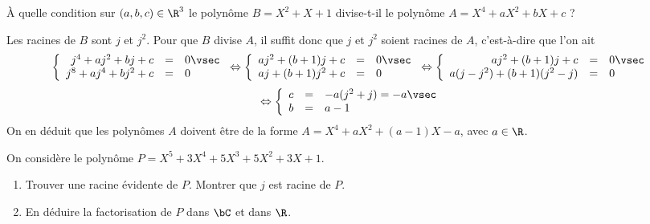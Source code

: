 \documentclass[a4paper, 11pt,reqno]{article}
\begin{document}
\begin{exercice}  \;
	\`{A} quelle condition sur $(a,b,c)\in\R^3$ le polyn\^{o}me $B=X^2+X+1$ divise-t-il le polyn\^ome $A=X^4+aX^2+bX+c$ ?
\end{exercice}
\begin{correction}  \;
	Les racines de $B$ sont $j$ et $j^2$. Pour que $B$ divise $A$, il suffit donc que $j$ et $j^2$ soient racines de $A$, c'est-\`a-dire que l'on ait
	$$\left\{ \begin{array}{rcl}
			j^4+aj^2+bj+c   & = & 0\vsec \\
			j^8+aj^4+bj^2+c & = & 0
		\end{array}\right.
		\Leftrightarrow
		\left\{ \begin{array}{rcl}
			aj^2+(b+1)j+c & = & 0\vsec \\
			aj+(b+1)j^2+c & = & 0
		\end{array}\right.
		\Leftrightarrow
		\left\{ \begin{array}{rcl}
			aj^2+(b+1)j+c         & = & 0\vsec \\
			a(j-j^2)+(b+1)(j^2-j) & = & 0
		\end{array}\right.
	$$
	$$
		\Leftrightarrow
		\left\{ \begin{array}{rcl}
			c & = & -a(j^2+j) = -a\vsec \\
			b & = & a-1
		\end{array}\right.
	$$
	On en d\'eduit que les polyn\^omes $A$ doivent \^etre de la forme $A=X^4+aX^2+(a-1)X-a$, avec $a\in \R$.
\end{correction}
\begin{exercice}  \;
	On consid\`ere le polyn\^ome $P=X^5+3X^4+5X^3+5X^2+3X+1$.
	\begin{enumerate}
		\item Trouver une racine \'evidente de $P$. Montrer que $j$ est racine de $P$.
		\item En d\'eduire la factorisation de $P$ dans $\bC$ et dans $\R$.
	\end{enumerate}
\end{exercice}
\end{document}
